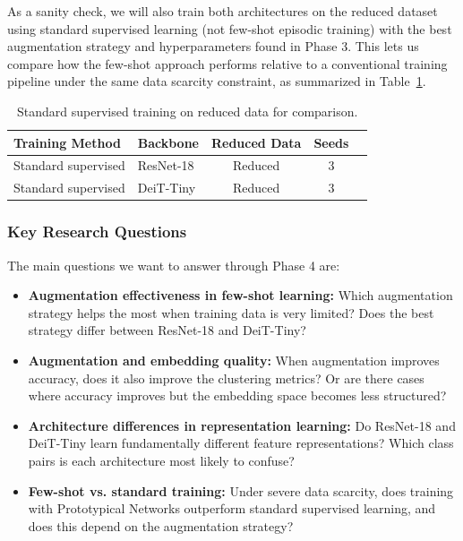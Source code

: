 \documentclass[12pt,a4paper]{article}
\begin{document}
As a sanity check, we will also train both architectures on the reduced dataset using standard supervised learning (not few-shot episodic training) with the best augmentation strategy and hyperparameters found in Phase 3. This lets us compare how the few-shot approach performs relative to a conventional training pipeline under the same data scarcity constraint, as summarized in Table~\ref{tab:standard_training}.

\begin{table}[H]
\centering
\caption{Standard supervised training on reduced data for comparison.}
\label{tab:standard_training}
\begin{tabular}{@{}llccc@{}}
\toprule
\textbf{Training Method} & \textbf{Backbone} & \textbf{Reduced Data} & \textbf{Seeds} \\
\midrule
Standard supervised & ResNet-18 & Reduced & 3 \\
Standard supervised & DeiT-Tiny & Reduced & 3 \\
\bottomrule
\end{tabular}
\end{table}

\subsubsection{Key Research Questions}

The main questions we want to answer through Phase 4 are:

\begin{itemize}[nosep]
    \item \textbf{Augmentation effectiveness in few-shot learning:} Which augmentation strategy helps the most when training data is very limited? Does the best strategy differ between ResNet-18 and DeiT-Tiny?
    
    \item \textbf{Augmentation and embedding quality:} When augmentation improves accuracy, does it also improve the clustering metrics? Or are there cases where accuracy improves but the embedding space becomes less structured?
    
    \item \textbf{Architecture differences in representation learning:} Do ResNet-18 and DeiT-Tiny learn fundamentally different feature representations? Which class pairs is each architecture most likely to confuse?
    
    \item \textbf{Few-shot vs. standard training:} Under severe data scarcity, does training with Prototypical Networks outperform standard supervised learning, and does this depend on the augmentation strategy?
\end{itemize}
\end{document}
